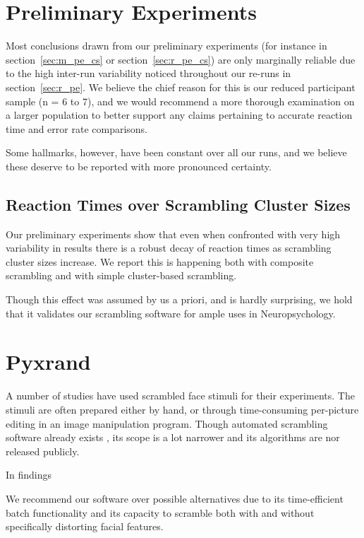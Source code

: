     \section{Preliminary Experiments}\label{sec:d_pe}
	Most conclusions drawn from our preliminary experiments (for instance in section~\ref{sec:m_pe_cs} or section~\ref{sec:r_pe_cs}) are only marginally reliable due to the high inter-run variability noticed throughout our re-runs in section~\ref{sec:r_pe}.
	We believe the chief reason for this is our reduced participant sample (n = 6 to 7), and we would recommend a more thorough examination on a larger population to better support any claims pertaining to accurate reaction time and error rate comparisons.
	
	Some hallmarks, however, have been constant over all our runs, and we believe these deserve to be reported with more pronounced certainty.
	\subsection{Reaction Times over Scrambling Cluster Sizes}
	    Our preliminary experiments show that even when confronted with very high variability in results there is a robust decay of reaction times as scrambling cluster sizes increase.
	    We report this is happening both with composite scrambling and with simple cluster-based scrambling.
	    
	    Though this effect was assumed by us a priori, and is hardly surprising, we hold that it validates our scrambling software for ample uses in Neuropsychology.
    \section{Pyxrand}
    A number of studies\cite{Rakover2013} have used scrambled face stimuli for their experiments.
    The stimuli are often prepared either by hand, or through time-consuming per-picture editing in an image manipulation program.
    Though automated scrambling software already exists \cite{Conway2008}, its scope is a lot narrower and its algorithms are nor released publicly.
    
    In findings 
    
    We recommend our software over possible alternatives due to its time-efficient batch functionality and its capacity to scramble both with and without specifically distorting facial features.



